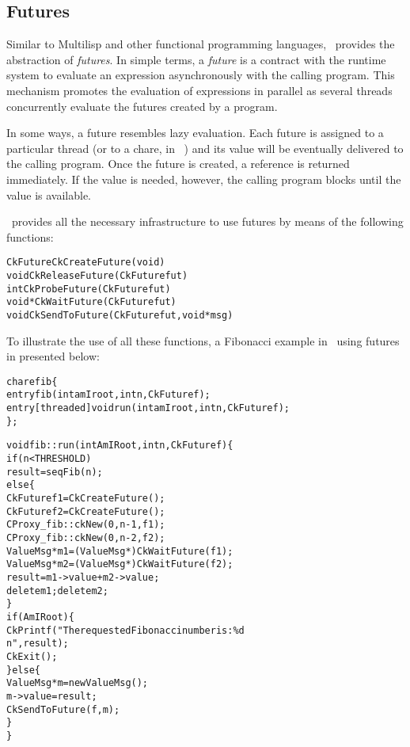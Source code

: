 \subsection{Futures}

\label{futures}

Similar to Multilisp and other functional programming languages, \charmpp\ provides the abstraction of {\em futures}. In simple terms, a {\em future} is a contract with the runtime system to evaluate an expression asynchronously with the calling program. This mechanism promotes the evaluation of expressions in parallel as several threads concurrently evaluate the futures created by a program.

In some ways, a future resembles lazy evaluation. Each future is assigned to a particular thread (or to a chare, in \charmpp\ ) and its value will be eventually delivered to the calling program. Once the future is created, a reference is returned immediately. If the value is needed, however, the calling program blocks until the value is available.

\charmpp\ provides all the necessary infrastructure to use futures by means of the following functions: 

\begin{alltt}
 CkFuture CkCreateFuture(void)
 void CkReleaseFuture(CkFuture fut)
 int CkProbeFuture(CkFuture fut)
 void *CkWaitFuture(CkFuture fut)
 void  CkSendToFuture(CkFuture fut, void *msg)
\end{alltt}

To illustrate the use of all these functions, a Fibonacci example in \charmpp\ using futures in presented below:

\begin{alltt}
chare fib \{
  entry fib(int amIroot, int n, CkFuture f);
  entry  [threaded] void run(int amIroot, int n, CkFuture f);
\};
\end{alltt}

\begin{alltt}
void  fib::run(int AmIRoot, int n, CkFuture f) \{
   if (n< THRESHOLD)
    result =seqFib(n);
  else \{
    CkFuture f1 = CkCreateFuture();
    CkFuture f2 = CkCreateFuture();
    CProxy_fib::ckNew(0,n-1,  f1);
    CProxy_fib::ckNew(0,n-2,  f2);
    ValueMsg * m1 = (ValueMsg *) CkWaitFuture(f1);
    ValueMsg * m2 = (ValueMsg *) CkWaitFuture(f2);
    result = m1->value + m2->value;
    delete m1; delete m2;
  \}
  if (AmIRoot) \{
    CkPrintf("The requested Fibonacci number is : \%d\\n", result);
    CkExit();  
  \} else \{
    ValueMsg *m = new ValueMsg();
    m->value = result;
    CkSendToFuture(f, m); 
  \}
\}
\end{alltt}

